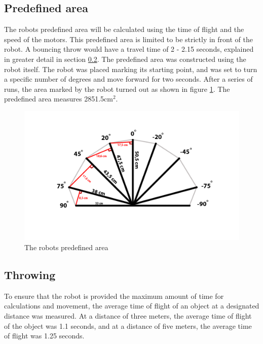 \subsection{Predefined area}
\label{sec:i1Predefined areaImplementation}
The robots predefined area will be calculated using the time of flight and the speed of the motors. 
This predefined area is limited to be strictly in front of the robot.
A bouncing throw would have a travel time of 2 - 2.15 seconds, explained in greater detail in section \ref{sec:i1ThrowingImplementation}. The predefined area was constructed using the robot itself. The robot was placed marking its starting point, and was set to turn a specific number of degrees and move forward for two seconds. After a series of runs, the area marked by the robot turned out as shown in figure \ref{figure:Predefined area}. The predefined area measures 2851.5cm\begin{math}^2\end{math}.

\begin{figure}[h]
\centering
\includegraphics[scale=0.35]{billeder/predefined-area}
\caption{The robots predefined area}
\label{figure:Predefined area}
\end{figure}

\subsection{Throwing}
\label{sec:i1ThrowingImplementation} 
To ensure that the robot is provided the maximum amount of time for calculations and movement, the average time of flight of an object at a designated distance was measured. At a distance of three meters, the average time of flight of the object was 1.1 seconds, and at a distance of five meters, the average time of flight was 1.25 seconds.

